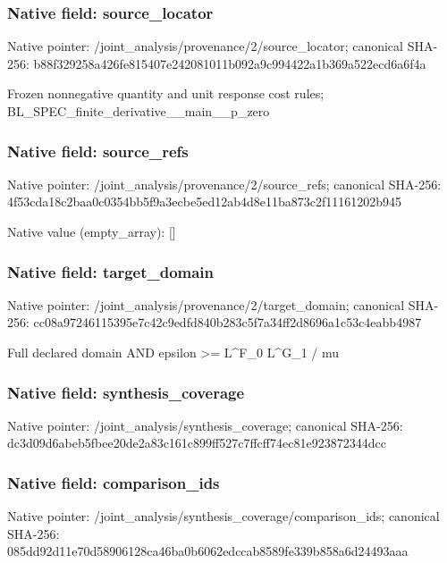\documentclass[10pt,a4paper]{article}
\begin{document}
\subsubsection{Native field: source\_\allowbreak{}locator}
Native pointer: /joint\_\allowbreak{}analysis/provenance/2/source\_\allowbreak{}locator; canonical SHA-256: b88f329258a426fe815407e242081011b092a9c994422a1b369a522ecd6a6f4a

\begingroup\raggedright\sloppy Frozen nonnegative quantity and unit response cost rules;\allowbreak{} BL\_\allowbreak{}SPEC\_\allowbreak{}finite\_\allowbreak{}derivative\_\allowbreak{}\_\allowbreak{}main\_\allowbreak{}\_\allowbreak{}p\_\allowbreak{}zero\par\endgroup

\subsubsection{Native field: source\_\allowbreak{}refs}
Native pointer: /joint\_\allowbreak{}analysis/provenance/2/source\_\allowbreak{}refs; canonical SHA-256: 4f53cda18c2baa0c0354bb5f9a3ecbe5ed12ab4d8e11ba873c2f11161202b945

Native value (empty\_\allowbreak{}array): []

\subsubsection{Native field: target\_\allowbreak{}domain}
Native pointer: /joint\_\allowbreak{}analysis/provenance/2/target\_\allowbreak{}domain; canonical SHA-256: cc08a97246115395e7c42c9edfd840b283c5f7a34ff2d8696a1c53c4eabb4987

\begingroup\raggedright\sloppy Full declared domain AND epsilon >=\allowbreak{} L\textasciicircum{}F\_\allowbreak{}0 L\textasciicircum{}G\_\allowbreak{}1 /\allowbreak{} mu\par\endgroup

\subsubsection{Native field: synthesis\_\allowbreak{}coverage}
Native pointer: /joint\_\allowbreak{}analysis/synthesis\_\allowbreak{}coverage; canonical SHA-256: dc3d09d6abeb5fbee20de2a83c161c899ff527c7ffcff74ec81e923872344dcc

\subsubsection{Native field: comparison\_\allowbreak{}ids}
Native pointer: /joint\_\allowbreak{}analysis/synthesis\_\allowbreak{}coverage/comparison\_\allowbreak{}ids; canonical SHA-256: 085dd92d11e70d58906128ca46ba0b6062edccab8589fe339b858a6d24493aaa
\end{document}
